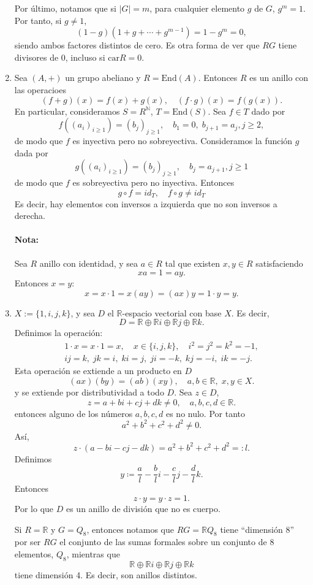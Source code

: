 \documentclass[11pt]{book}
\def\N{\mathbb{N}}
\def\R{\mathbb{R}}
\def\End{\mathrm{End}}
\def\car{\mathrm{car}}
\theoremstyle{definition}
\begin{document}
\begin{enumerate}
    Por último, notamos que si $|G|=m$, para cualquier elemento $g$ de $G$, $g^m=1$. Por tanto, si $g\neq 1$,\[
        (1-g)(1+g+\cdots+g^{m-1})=1-g^m=0,
    \]siendo ambos factores distintos de cero. Es otra forma de ver que $RG$ tiene divisores de 0, incluso si $\car R=0$.

    \item Sea $(A,+)$ un grupo abeliano y $R=\End(A)$. Entonces $R$ es un anillo con las operacioes\[
    (f+g)(x)=f(x)+g(x),\quad (f\cdot g)(x)=f(g(x)).
    \]En particular, consideramos $S=R^\N$, $T=\End(S)$. Sea $f\in T$ dado por\[
    f((a_i)_{i\geq 1})=(b_j)_{j\geq 1},\quad b_1=0,\; b_{j+1}=a_j, j\geq 2,
    \]de modo que $f$ es inyectiva pero no sobreyectiva. Consideramos la función $g$ dada por\[
    g((a_i)_{i\geq 1})=(b_j)_{j\geq 1},\quad b_j=a_{j+1},j\geq 1
    \]de modo que $f$ es sobreyectiva pero no inyectiva. Entonces\[
    g\circ f= id_T,\quad f\circ g\neq id_T
    \]Es decir, hay elementos con inversos a izquierda que no son inversos a derecha.

    \paragraph{Nota:} Sea $R$ anillo con identidad, y sea $a\in R$ tal que existen $x,y\in R$ satisfaciendo\[
        xa = 1 = ay.
    \]Entonces $x=y$:\[
        x=x\cdot 1 = x(ay)= (ax)y = 1\cdot y = y.
    \]

    \item $X:=\{1,i,j,k\}$, y sea $D$ el $\R$-espacio vectorial con base $X$. Es decir,\[
    D=\R\oplus\R i\oplus\R j\oplus\R k.
    \] Definimos la operación:\[\begin{split}
        1\cdot x = x\cdot 1 = x,\quad x\in\{i,j,k\},\quad i^2=j^2=k^2=-1,\\
        ij = k,\; jk=i,\; ki=j,\; ji=-k,\; kj=-i,\; ik=-j.
    \end{split}
    \]Esta operación se extiende a un producto en $D$\[
    (ax)(by) = (ab)(xy),\quad a,b\in\R,\; x,y\in X.
    \]y se extiende por distributividad a todo $D$. Sea $z\in D$,\[
    z=a+bi+cj+dk\neq 0,\quad a,b,c,d\in\R.
    \]entonces alguno de los números $a,b,c,d$ es no nulo. Por tanto\[
        a^2+b^2+c^2+d^2\neq 0.
    \]Así,\[
    z\cdot (a-bi-cj-dk)=a^2+b^2+c^2+d^2=:l.
    \]Definimos\[
    y\coloneq \frac{a}{l}-\frac{b}{l}i-\frac{c}{l}j - \frac{d}{l}k.
    \]Entonces\[
    z\cdot y=y\cdot z=1.
    \]Por lo que $D$ es un anillo de división que no es cuerpo.

    Si $R=\R$ y $G=Q_8$, entonces notamos que $RG=\R Q_8$ tiene ``dimensión 8'' por ser $RG$ el conjunto de las sumas formales sobre un conjunto de 8 elementos, $Q_8$, mientras que\[
    \R\oplus\R i\oplus \R j\oplus \R k
    \]tiene dimensión 4. Es decir, son anillos distintos.
\end{enumerate}
\end{document}
